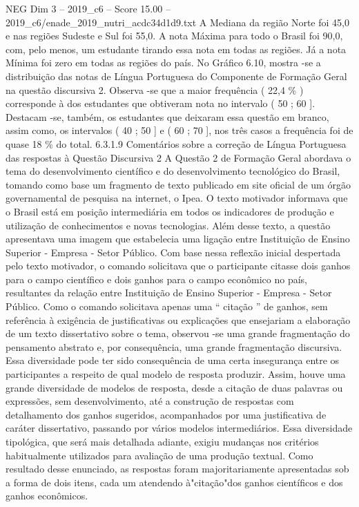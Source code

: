 \begin{textsample}{NEG Dim 3 – 2019\_c6 – Score 15.00 – 2019\_c6/enade\_2019\_nutri\_acdc34d1d9.txt}
A Mediana da região Norte foi 45,0 e nas regiões Sudeste e Sul foi 55,0.
A nota Máxima para todo o Brasil foi 90,0, com, pelo menos, um estudante tirando essa nota em todas as regiões.
Já a nota Mínima foi zero em todas as regiões do país.
No Gráfico 6.10, mostra -se a distribuição das notas de Língua Portuguesa do Componente de Formação Geral na questão discursiva 2.
Observa -se que a maior frequência ( 22,4 \% ) corresponde à dos estudantes que obtiveram nota no intervalo ( 50 ; 60 ].
Destacam -se, também, os estudantes que deixaram essa questão em branco, assim como, os intervalos ( 40 ; 50 ] e ( 60 ; 70 ], nos três casos a frequência foi de quase 18 \% do total. 6.3.1.9 Comentários sobre a correção de Língua Portuguesa das respostas à Questão Discursiva 2 A Questão 2 de Formação Geral abordava o tema do desenvolvimento científico e do desenvolvimento tecnológico do Brasil, tomando como base um fragmento de texto publicado em site oficial de um órgão governamental de pesquisa na internet, o Ipea.
O texto motivador informava que o Brasil está em posição intermediária em todos os indicadores de produção e utilização de conhecimentos e novas tecnologias.
Além desse texto, a questão apresentava uma imagem que estabelecia uma ligação entre Instituição de Ensino Superior - Empresa - Setor Público.
Com base nessa reflexão inicial despertada pelo texto motivador, o comando solicitava que o participante citasse dois ganhos para o campo científico e dois ganhos para o campo econômico no país, resultantes da relação entre Instituição de Ensino Superior - Empresa - Setor Público.
Como o comando solicitava apenas uma “ citação ” de ganhos, sem referência à exigência de justificativas ou explicações que ensejariam a elaboração de um texto dissertativo sobre o tema, observou -se uma grande fragmentação do pensamento abstrato e, por consequência, uma grande fragmentação discursiva.
Essa diversidade pode ter sido consequência de uma certa insegurança entre os participantes a respeito de qual modelo de resposta produzir.
Assim, houve uma grande diversidade de modelos de resposta, desde a citação de duas palavras ou expressões, sem desenvolvimento, até a construção de respostas com detalhamento dos ganhos sugeridos, acompanhados por uma justificativa de caráter dissertativo, passando por vários modelos intermediários.
Essa diversidade tipológica, que será mais detalhada adiante, exigiu mudanças nos critérios habitualmente utilizados para avaliação de uma produção textual.
Como resultado desse enunciado, as respostas foram majoritariamente apresentadas sob a forma de dois itens, cada um atendendo à"citação"dos ganhos científicos e dos ganhos econômicos.

\end{textsample}
